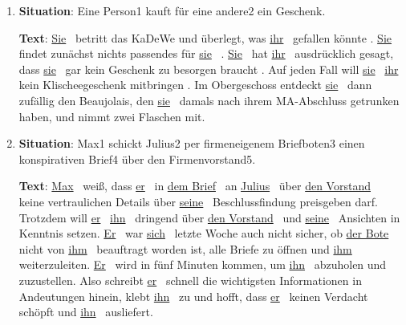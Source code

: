 \begin{enumerate}
  \item\doublespacing%
      \textbf{Situation}: Eine Person1 kauft für eine andere2 ein Geschenk.
      
      \textbf{Text}: \uline{Sie}~ betritt das KaDeWe und überlegt, was \uline{ihr}~ gefallen könnte .
      \uline{Sie}~ findet zunächst nichts passendes für \uline{sie}~ .
      \uline{Sie}~ hat \uline{ihr}~ ausdrücklich gesagt, dass \uline{sie}~ gar kein Geschenk zu besorgen braucht .
      Auf jeden Fall will \uline{sie}~ \uline{ihr}~ kein Klischeegeschenk mitbringen .
      Im Obergeschoss entdeckt \uline{sie}~ dann zufällig den Beaujolais, den \uline{sie}~ damals nach ihrem MA-Abschluss getrunken haben, und nimmt zwei Flaschen mit.
    \Zeile
  \item\doublespacing
      \textbf{Situation}: Max1 schickt Julius2 per firmeneigenem Briefboten3 einen konspirativen Brief4 über den Firmenvorstand5.

      \textbf{Text}: \uline{Max}~ weiß, dass \uline{er}~ in \uline{dem Brief}~ an \uline{Julius}~ über \uline{den Vorstand}~ keine vertraulichen Details über \uline{seine}~ Beschlussfindung preisgeben darf.
      Trotzdem will \uline{er}~ \uline{ihn}~ dringend über \uline{den Vorstand}~ und \uline{seine}~ Ansichten in Kenntnis setzen.
      \uline{Er}~ war \uline{sich}~ letzte Woche auch nicht sicher, ob \uline{der Bote}~ nicht von \uline{ihm}~ beauftragt worden ist, alle Briefe zu öffnen und \uline{ihm}~ weiterzuleiten.
      \uline{Er}~ wird in fünf Minuten kommen, um \uline{ihn}~ abzuholen und zuzustellen.
      Also schreibt \uline{er}~ schnell die wichtigsten Informationen in Andeutungen hinein, klebt \uline{ihn}~ zu und hofft, dass \uline{er}~ keinen Verdacht schöpft und \uline{ihn}~ ausliefert.
\end{enumerate}

